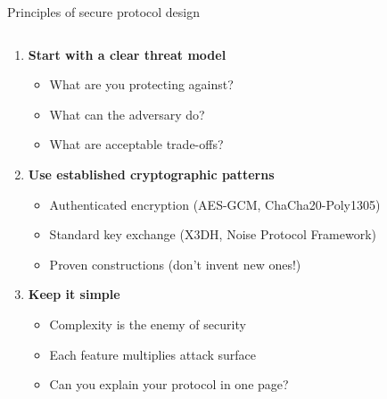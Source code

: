 \documentclass[aspectratio=169, lualatex, handout]{beamer}
\begin{document}
\begin{frame}{Principles of secure protocol design}
	\begin{columns}[c]
		\begin{column}{1\textwidth}
			\begin{enumerate}
				\item \textbf{Start with a clear threat model}
				      \begin{itemize}
					      \item What are you protecting against?
					      \item What can the adversary do?
					      \item What are acceptable trade-offs?
				      \end{itemize}
				\item \textbf{Use established cryptographic patterns}
				      \begin{itemize}
					      \item Authenticated encryption (AES-GCM, ChaCha20-Poly1305)
					      \item Standard key exchange (X3DH, Noise Protocol Framework)
					      \item Proven constructions (don't invent new ones!)
				      \end{itemize}
				\item \textbf{Keep it simple}
				      \begin{itemize}
					      \item Complexity is the enemy of security
					      \item Each feature multiplies attack surface
					      \item Can you explain your protocol in one page?
				      \end{itemize}
			\end{enumerate}
		\end{column}
	\end{columns}
\end{frame}
\end{document}
